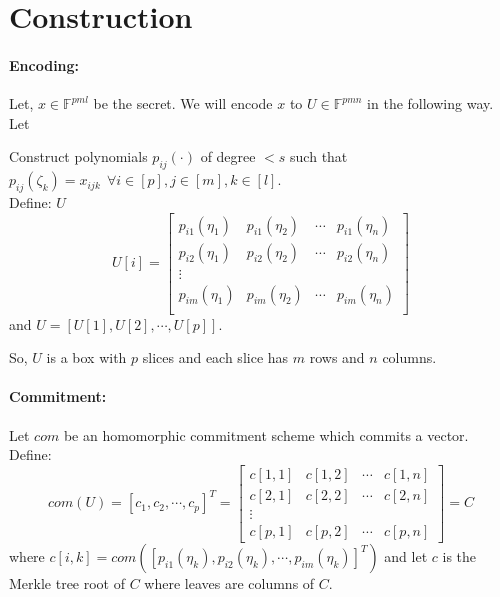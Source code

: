 \section{Construction}




\paragraph{Encoding:}
Let, $x\in \mathbb{F}^{pml}$ %
be the secret. We will encode $x$ to $U\in \mathbb{F}^{pmn}$ in the following way.\\
Let


Construct polynomials $p_{ij}(\cdot)$ %
of degree $< s$ such that 
$ p_{ij}(\zeta_k)=x_{ijk} ~~\forall i\in [p], j\in [m], k\in [l]$.\\
Define:  $U$ %
$$U[i]=
\begin{bmatrix}
	p_{i1}(\eta_1) & p_{i1}(\eta_2) & \cdots & p_{i1}(\eta_n)\\
	p_{i2}(\eta_1) & p_{i2}(\eta_2) & \cdots & p_{i2}(\eta_n)\\
	\vdots\\
	p_{im}(\eta_1) & p_{im}(\eta_2) & \cdots & p_{im}(\eta_n)\\
\end{bmatrix}
$$
and $U=[U[1], U[2], \cdots, U[p]]$.

So, $U$ is a box with $p$ slices and each slice has $m$ rows and $n$ columns.

\paragraph{Commitment:} Let $com$ be an homomorphic commitment scheme which commits a vector. Define:
$$com(U)= [c_1,c_2,\cdots , c_p]^T=
 \begin{bmatrix} 
c[1,1] & c[1,2] & \cdots & c[1,n] \\
c[2,1] & c[2,2] & \cdots & c[2,n] \\
\vdots\\
c[p,1] & c[p,2] & \cdots & c[p,n]
\end{bmatrix}
=C$$
where $c[i,k]=com([p_{i1}(\eta_k),p_{i2}(\eta_k),\cdots , p_{im}(\eta_k)]^T)$ and let $c$ is the Merkle tree root of $C$ where leaves are columns of $C$.

